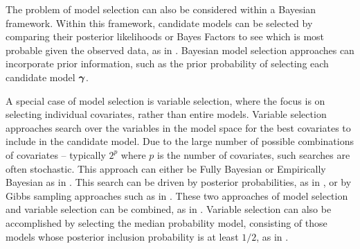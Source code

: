 The problem of model selection can also be considered within a Bayesian framework. Within this framework,
candidate models can be selected by comparing their posterior likelihoods or Bayes Factors to see which is
most probable given the observed data, as in \cite{Kass1993}. Bayesian model selection approaches can
incorporate prior information, such as the prior probability of selecting each candidate model ${\boldsymbol \gamma}$.

A special case of model selection is variable selection, where the focus is on selecting individual
covariates, rather than entire models. Variable selection approaches search over the
variables in the model space for the best covariates to include in the candidate model. Due to the large
number of possible combinations of covariates -- typically $2^p$ where $p$ is the number of covariates, such
searches are often stochastic. This approach can either be Fully Bayesian or Empirically Bayesian as in
\cite{Cui2008}.  This search can be driven by posterior probabilities, as in \cite{Casella2006}, or by Gibbs
sampling approaches such as in \cite{George1993}. These two approaches of model selection and variable
selection can be combined, as in \cite{Geweke1996}. Variable selection can also be accomplished by selecting
the median probability model, consisting of those models whose posterior inclusion probability is at least
$1/2$, as in \cite{Barbieri2004}.







